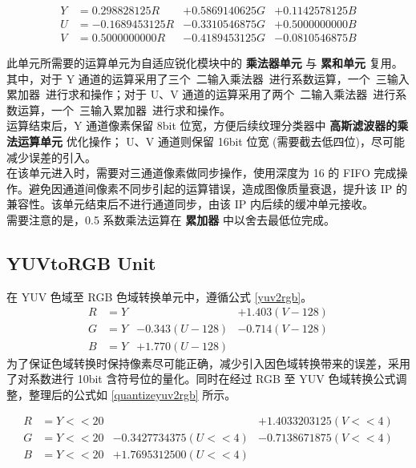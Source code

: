 \documentclass[12pt, a4paper, oneside]{ctexbook}
\begin{document}
	\begin{equation} \label{quantizergb2yuv}
		\begin{aligned}
			Y &= 0.298828125 R &+ 0.5869140625 G &+ 0.1142578125 B \\
			U &= -0.1689453125 R &- 0.3310546875 G& + 0.5000000000 B \\
			V &= 0.5000000000 R&- 0.4189453125 G&- 0.0810546875 B
		\end{aligned}
	\end{equation}
	
	此单元所需要的运算单元为自适应锐化模块中的 \textbf{乘法器单元} 与 \textbf{累和单元} 复用。其中，对于 Y 通道的运算采用了三个\ 二输入乘法器\ 进行系数运算，一个\ 三输入累加器\ 进行求和操作；对于 U、V 通道的运算采用了两个\ 二输入乘法器\ 进行系数运算，一个\ 三输入累加器\ 进行求和操作。\\
	
	运算结束后，Y 通道像素保留 8bit 位宽，方便后续纹理分类器中 \textbf{高斯滤波器的乘法运算单元} 优化操作； U、V 通道则保留 16bit 位宽 (需要截去低四位)，尽可能减少误差的引入。\\
	
	在该单元进入时，需要对三通道像素做同步操作，使用深度为 16 的 FIFO 完成操作。避免因通道间像素不同步引起的运算错误，造成图像质量衰退，提升该 IP 的兼容性。该单元结束后不进行通道同步，由该 IP 内后续的缓冲单元接收。\\
	
	需要注意的是，0.5 系数乘法运算在 \textbf{累加器} 中以舍去最低位完成。
	
	\subsection{YUVtoRGB Unit}
	
	在 YUV 色域至 RGB 色域转换单元中，遵循公式 \ref{yuv2rgb}。
	\begin{equation} \label{yuv2rgb}
		\begin{aligned}
			R &= Y & &+ 1.403(V - 128) \\
			G &= Y &- 0.343(U - 128) &-0.714(V- 128) \\
			B &= Y &+ 1.770(U - 128) & 
		\end{aligned}
	\end{equation}
	为了保证色域转换时保持像素尽可能正确，减少引入因色域转换带来的误差，采用了对系数进行 10bit 含符号位的量化。同时在经过 RGB 至 YUV 色域转换公式调整，整理后的公式如 \ref{quantizeyuv2rgb} 所示。
	
	\begin{equation} \label{quantizeyuv2rgb}
		\begin{aligned}
			R &= Y << 20 & &+ 1.4033203125(V << 4) \\
			G &= Y << 20 &- 0.3427734375(U << 4) &-0.7138671875(V << 4) \\
			B &= Y << 20 &+ 1.7695312500(U << 4) &
		\end{aligned}
	\end{equation}
	
\end{document}
